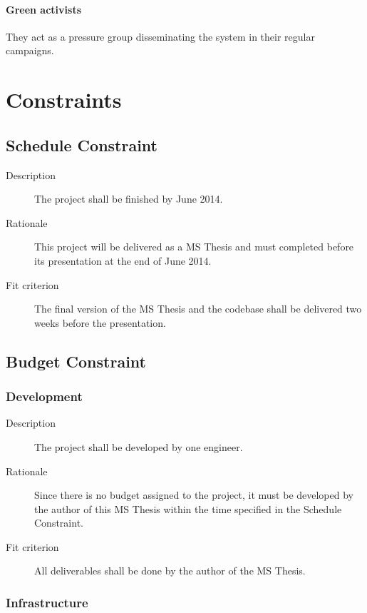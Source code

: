 \paragraph{Green activists} They act as a pressure group disseminating the system in their regular campaigns.

\section{Constraints}
\subsection{Schedule Constraint}

\begin{description}
\item[Description] The project shall be finished by June 2014.
\item[Rationale] This project will be delivered as a MS Thesis and must completed before its presentation at the end of June 2014.
\item[Fit criterion] The final version of the MS Thesis and the codebase shall be delivered two weeks before the  presentation.
\end{description}

\subsection{Budget Constraint}

\subsubsection{Development}

\begin{description}
\item[Description] The project shall be developed by one engineer.
\item[Rationale] Since there is no budget assigned to the project, it must be developed by the author of this MS Thesis within the time specified in the Schedule Constraint.
\item[Fit criterion] All deliverables shall be done by the author of the MS Thesis.
\end{description}

\subsubsection{Infrastructure}

